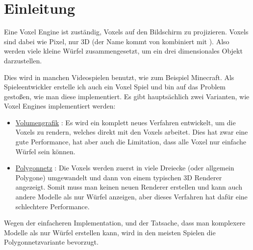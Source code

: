 \section{Einleitung}

Eine Voxel Engine ist zuständig, Voxels auf den
Bildschirm zu projizieren. Voxels sind dabei wie
Pixel, nur 3D (der Name  kommt von
 kombiniert mit ).
Also werden viele kleine Würfel zusammengesetzt,
um ein drei dimensionales Objekt darzustellen.

Dies wird in manchen Videospielen benutzt, wie
zum Beispiel Minecraft.
Als Spieleentwickler erstelle ich auch
ein Voxel Spiel und bin auf das Problem gestoßen,
wie man diese implementiert.
Es gibt hauptsächlich zwei Varianten,
wie Voxel Engines implementiert werden:

\begin{itemize}
	\item \href{https://de.wikipedia.org/wiki/Volumengrafik}{Volumengrafik} \cite{wiki_volume}:
	Es wird ein komplett neues Verfahren entwickelt,
	um die Voxels zu rendern, welches direkt mit
	den Voxels arbeitet. Dies hat zwar eine gute
	Performance, hat aber auch die Limitation,
	dass alle Voxel nur einfache Würfel sein können.

	\item \href{https://de.wikipedia.org/wiki/Polygonnetz}{Polygonnetz} \cite{wiki_poly}:
	Die Voxels werden zuerst in viele
	Dreiecke (oder allgemein Polygone) umgewandelt
	und dann von einem typischen 3D Renderer angezeigt.
	Somit muss man keinen neuen Renderer erstellen und
	kann auch andere Modelle als nur Würfel anzeigen,
	aber dieses Verfahren hat dafür eine
	schlechtere Performance.
\end{itemize}

Wegen der einfacheren Implementation,
und der Tatsache, dass man
komplexere Modelle als nur Würfel erstellen kann,
wird in den meisten Spielen die
Polygonnetzvariante bevorzugt.


